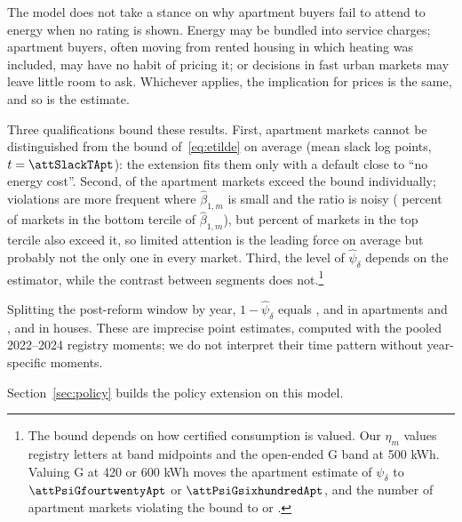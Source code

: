 The model does not take a stance on why apartment buyers fail to attend to energy when no rating is shown. Energy may be bundled into service charges; apartment buyers, often moving from rented housing in which heating was included, may have no habit of pricing it; or decisions in fast urban markets may leave little room to ask. Whichever applies, the implication for prices is the same, and so is the estimate.

Three qualifications bound these results. First, apartment markets cannot be distinguished from the bound of~\eqref{eq:etilde} on average (mean slack \attSlackApt{} log points, $t=\attSlackTApt$): the extension fits them only with a default close to ``no energy cost''. Second, \attNViolApt{} of the \attNMarketsApt{} apartment markets exceed the bound individually; violations are more frequent where $\hat\beta_{1,m}$ is small and the ratio is noisy (\attShareViolBottomApt{} percent of markets in the bottom tercile of $\hat\beta_{1,m}$), but \attShareViolTopApt{} percent of markets in the top tercile also exceed it, so limited attention is the leading force on average but probably not the only one in every market. Third, the level of $\hat\psi_\delta$ depends on the estimator, while the contrast between segments does not.\footnote{The bound depends on how certified consumption is valued. Our $\eta_m$ values registry letters at band midpoints and the open-ended G band at 500 kWh. Valuing G at 420 or 600 kWh moves the apartment estimate of $\psi_\delta$ to $\attPsiGfourtwentyApt$ or $\attPsiGsixhundredApt$, and the number of apartment markets violating the bound to \attNViolGfourtwentyApt{} or \attNViolGsixhundredApt. %
}

Splitting the post-reform window by year, $1-\hat\psi_\delta$ equals \attOneMinusPsiYoneApt, \attOneMinusPsiYtwoApt{} and \attOneMinusPsiYthreeApt{} in apartments and \attOneMinusPsiYoneHouse, \attOneMinusPsiYtwoHouse{} and \attOneMinusPsiYthreeHouse{} in houses. These are imprecise point estimates, computed with the pooled 2022--2024 registry moments; we do not interpret their time pattern without year-specific moments. %

Section~\ref{sec:policy} builds the policy extension on this model.
